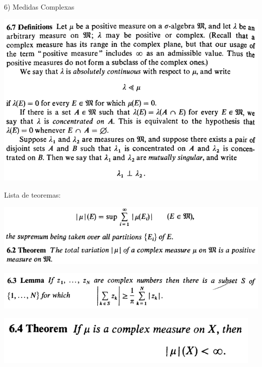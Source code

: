 \documentclass[12pt]{article}
\begin{document}
\vspace{3mm}

6) Medidas Complexas

\vspace{3mm}

		\begin{center}
		\includegraphics{d6ponto7}
		\end{center}

Lista de teoremas:

		\begin{center}
		\includegraphics{6ponto2}
		\end{center}

		\begin{center}
		\includegraphics{6ponto3}
		\end{center}

		\begin{center}
		\includegraphics{6ponto4}
		\end{center}
\end{document}
